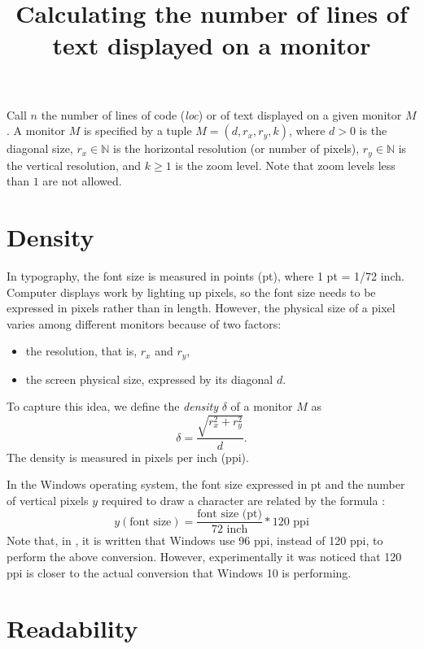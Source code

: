 \documentclass{article}
\date{}
\begin{document}
\title{Calculating the number of lines of text displayed on a monitor}

\maketitle

Call $n$ the number of lines of code (\textit{loc}) or of text displayed on a given monitor $M$. A monitor $M$ is specified by a tuple $M=(d,r_x,r_y,k)$, where $d > 0$ is the diagonal size, $r_x \in \mathbb{N}$ is the horizontal resolution (or number of pixels), $r_y \in \mathbb{N}$ is the vertical resolution, and $k \geq 1$ is the zoom level. Note that zoom levels less than $1$ are not allowed.

\section{Density}

In typography, the font size is measured in points (pt), where 1 pt = 1/72 inch. Computer displays work by lighting up pixels, so the font size needs to be expressed in pixels rather than in length. However, the physical size of a pixel varies among different monitors because of two factors:
\begin{itemize}
\item the resolution, that is, $r_x$ and $r_y$,
\item the screen physical size, expressed by its diagonal $d$.
\end{itemize}
To capture this idea, we define the \textit{density} $\delta$ of a monitor $M$ as
\begin{equation} \label{delta}
\delta = \frac{\sqrt{r_x^2+r_y^2}}{d}.
\end{equation}
The density is measured in pixels per inch (ppi).

In the Windows operating system, the font size expressed in pt and the number of vertical pixels $y$ required to draw a character are related by the formula \cite{win-dpi}:
\begin{equation} \label{y-fontsize}
y(\text{font size}) = \frac{\text{font size (pt)}}{72 \text{ inch}} * 120 \text{ ppi}
\end{equation}
Note that, in \cite{win-dpi}, it is written that Windows use 96 ppi, instead of 120 ppi, to perform the above conversion. However, experimentally it was noticed that 120 ppi is closer to the actual conversion that Windows 10 is performing. 

\section{Readability}
\end{document}
